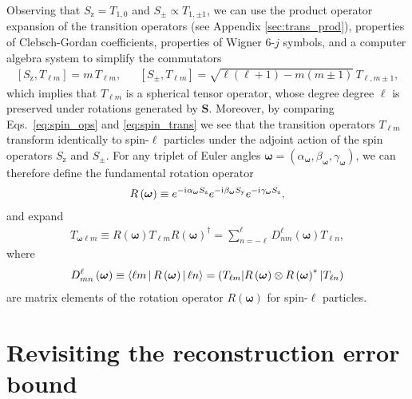 \documentclass[notitlepage,twocolumn]{revtex4-2}
\newcommand{\p}[1]{\left(#1\right)} %
\renewcommand{\sp}[1]{\left[#1\right]} %
\newcommand{\bk}{\Braket} %
\renewcommand{\v}{\bm} %
\renewcommand{\i}{\mathrm{i}\mkern1mu} %
\newcommand{\y}{\text{y}}
\newcommand{\z}{\text{z}}
\def\obk#1{\mathinner{({#1})}}
\newcommand{\1}{\mathds{1}}
\begin{document}
Observing that $S_\z=T_{1,0}$ and $S_\pm\propto T_{1,\pm1}$, we can use the product operator expansion of the transition operators (see Appendix \ref{sec:trans_prod}), properties of Clebsch-Gordan coefficients, properties of Wigner $6$-$j$ symbols, and a computer algebra system to simplify the commutators
\begin{align}
  \sp{S_\z,T_{\ell m}} = m\, T_{\ell m},
  &&
  \sp{S_\pm,T_{\ell m}} = \sqrt{\ell\p{\ell+1}-m\p{m\pm 1}}\, T_{\ell,m\pm1},
  \label{eq:spin_trans}
\end{align}
which implies that $T_{\ell m}$ is a spherical tensor operator, whose degree degree $\ell$ is preserved under rotations generated by $\v S$.
Moreover, by comparing Eqs.~\eqref{eq:spin_ops} and \eqref{eq:spin_trans} we see that the transition operators $T_{\ell m}$ transform identically to spin-$\ell$ particles under the adjoint action of the spin operators $S_\z$ and $S_\pm$.
For any triplet of Euler angles $\v\omega=\p{\alpha_{\v\omega},\beta_{\v\omega},\gamma_{\v\omega}}$, we can therefore define the fundamental rotation operator
\begin{align}
  R\p{\v\omega} \equiv e^{-\i\alpha_{\v\omega}S_\z} e^{-\i\beta_{\v\omega}S_\y} e^{-\i\gamma_{\v\omega}S_\z},
\end{align}
and expand
\begin{align}
  T_{\v\omega\ell m}
  \equiv R\p{\v\omega} T_{\ell m} R\p{\v\omega}^\dag
  = \sum_{n=-\ell}^\ell D_{nm}^\ell\p{\v\omega} T_{\ell n},
\end{align}
where
\begin{align}
  D_{mn}^\ell\p{\v\omega} \equiv \bk{\ell m|R\p{\v\omega}|\ell n}
  = \obk{T_{\ell m}|R\p{\v\omega}\otimes R\p{\v\omega}^*|T_{\ell n}}
\end{align}
are matrix elements of the rotation operator $R\p{\v\omega}$ for spin-$\ell$ particles.

\section{Revisiting the reconstruction error bound}
\label{sec:error}
\end{document}
